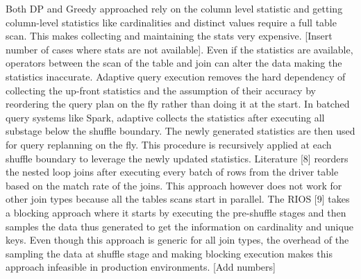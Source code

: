 Both DP and Greedy approached rely on the column level statistic and getting column-level statistics like cardinalities and distinct values require a full table scan. 
This makes collecting and maintaining the stats very expensive. [Insert number of cases where stats are not available]. Even if the statistics are available, operators between the scan of the table and join can alter the data making the statistics inaccurate. 
Adaptive query execution removes the hard dependency of collecting the up-front statistics and the assumption of their accuracy by reordering the query plan on the fly rather than doing it at the start. In batched query systems like Spark, adaptive collects the statistics after executing all substage below the shuffle boundary. 
The newly generated statistics are then used for query replanning on the fly. This procedure is recursively applied at each shuffle boundary to leverage the newly updated statistics. Literature [8] reorders the nested loop joins after executing every batch of rows from the driver table based on the match rate of the joins. This approach however does not work for other join types because all the tables scans start in parallel. The  RIOS [9] takes a blocking approach where it starts by executing the pre-shuffle stages and then samples the data thus generated to get the information on cardinality and unique keys. Even though this approach is generic for all join types, the overhead of the sampling the data at shuffle stage and making blocking execution makes this approach infeasible in production environments. [Add numbers]
